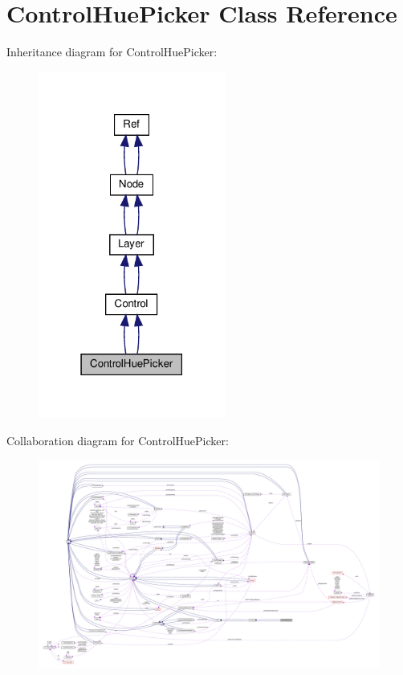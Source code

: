 \hypertarget{classControlHuePicker}{}\section{Control\+Hue\+Picker Class Reference}
\label{classControlHuePicker}


Inheritance diagram for Control\+Hue\+Picker\+:
\nopagebreak
\begin{figure}[H]
\begin{center}
\leavevmode
\includegraphics[width=174pt]{classControlHuePicker__inherit__graph}
\end{center}
\end{figure}


Collaboration diagram for Control\+Hue\+Picker\+:
\nopagebreak
\begin{figure}[H]
\begin{center}
\leavevmode
\includegraphics[width=350pt]{classControlHuePicker__coll__graph}
\end{center}
\end{figure}
